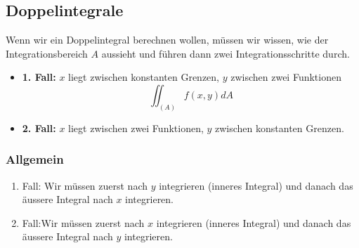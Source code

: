 \subsection{Doppelintegrale}
Wenn wir ein Doppelintegral berechnen wollen, müssen wir wissen, wie der Integrationsbereich $A$ aussieht und führen dann zwei Integrationsschritte durch.
\begin{itemize}
	\item \textbf{1. Fall:} $x$ liegt zwischen konstanten Grenzen, $y$ zwischen zwei Funktionen
	$$ \iint_{(A)} f(x,y) dA$$ 
	\item \textbf{2. Fall:} $x$ liegt zwischen zwei Funktionen, $y$ zwischen konstanten Grenzen.
\end{itemize}

\subsubsection{Allgemein}
\begin{enumerate}
	\item Fall: Wir müssen zuerst nach $y$ integrieren (inneres Integral) und danach das äussere Integral nach $x$ integrieren.
	\item Fall:Wir müssen zuerst nach $x$ integrieren (inneres Integral) und danach das äussere Integral nach $y$ integrieren.
\end{enumerate}

